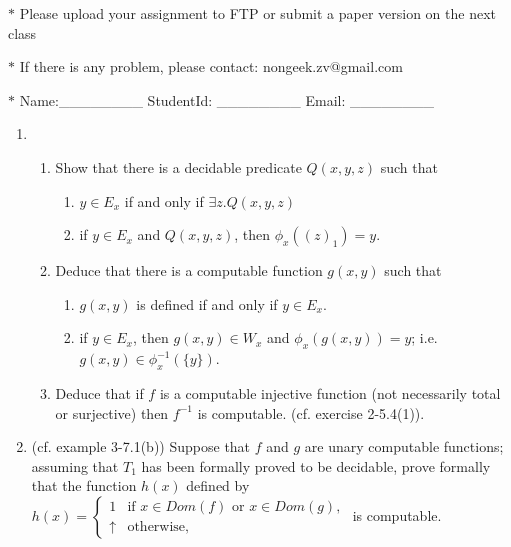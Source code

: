 \documentclass[12pt,a4paper]{article}
\theoremstyle{definition}
\numberwithin{equation}{section}
\numberwithin{figure}{section}
\begin{document}
\noindent{}
\begin{center}
\footnotesize{\color{red}$*$ Please upload your assignment to FTP or submit a paper version on the next class}

\footnotesize{\color{red}$*$ If there is any problem, please contact: nongeek.zv@gmail.com }

\footnotesize{\color{blue}$*$ Name:\_\_\_\_\_\_\_\_ \quad StudentId: \_\_\_\_\_\_\_\_ \quad Email: \_\_\_\_\_\_\_\_}
\end{center}


\begin{enumerate}%

\item
\begin{enumerate}
\item Show that there is a decidable predicate $Q(x,y,z)$ such that
\begin{enumerate}
\item $y\in E_x$ if and only if $\exists z.Q(x,y,z)$
\item if $y\in E_x$ and $Q(x,y,z)$, then $\phi_x((z)_1)=y$.
\end{enumerate}
\item Deduce that there is a computable function $g(x,y)$ such that
\begin{enumerate}
\item $g(x,y)$ is defined if and only if $y\in E_x$.
\item if $y\in E_x$, then $g(x,y)\in W_x$ and $\phi_x(g(x,y))=y$; i.e. $g(x,y)\in \phi^{-1}_x(\{y\})$.
\end{enumerate}
\item Deduce that if $f$ is a computable injective function (not necessarily total or surjective) then $f^{-1}$ is computable. (cf. exercise 2-5.4(1)).
\end{enumerate}
\item (cf. example 3-7.1(b)) Suppose that $f$ and $g$ are unary computable functions; assuming that $T_1$ has been formally proved to be decidable, prove formally that the function $h(x)$ defined by \\
    $h(x)=\left\{\begin{array}{ll}
    1& \mbox{if } x\in Dom(f) \mbox{ or } x\in Dom(g),\\
    \uparrow & \mbox{otherwise},
    \end{array}\right.$ is computable.


\end{enumerate}
\end{document}
